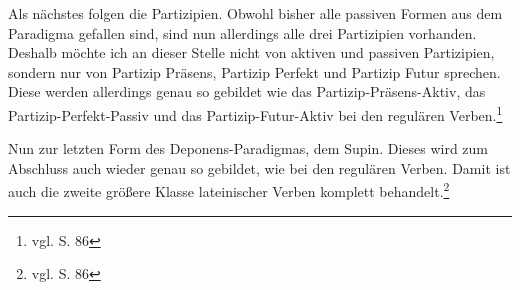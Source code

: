 Als nächstes folgen die Partizipien. Obwohl bisher alle passiven Formen aus dem Paradigma gefallen sind, sind nun allerdings alle drei Partizipien vorhanden. Deshalb möchte ich an dieser Stelle nicht von aktiven und passiven Partizipien, sondern nur von Partizip Präsens, Partizip Perfekt und Partizip Futur sprechen. Diese werden allerdings genau so gebildet wie das Partizip-Präsens-Aktiv, das Partizip-Perfekt-Passiv und das Partizip-Futur-Aktiv bei den regulären Verben.\footnote{vgl. \cite{BAYER-LINDAUER1994} S. 86} \par
Nun zur letzten Form des Deponens-Paradigmas, dem Supin. Dieses wird zum Abschluss auch wieder genau so gebildet, wie bei den regulären Verben. Damit ist auch die zweite größere Klasse lateinischer Verben komplett behandelt.\footnote{vgl. \cite{BAYER-LINDAUER1994} S. 86}
\FloatBarrier
